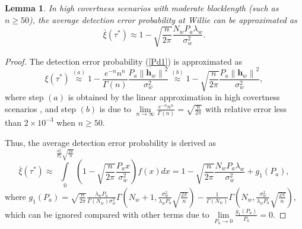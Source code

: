 \documentclass[conference]{IEEEtran}
\newtheorem{lemma}{Lemma}
\begin{document}
\begin{lemma}
	In high covertness scenarios with moderate blocklength (such as $n \ge 50$), the average detection error probability at Willie can be approximated as
	\begin{equation}\label{ave_Pd2}
		{\bar \xi}\left( {{\tau ^*}} \right) \approx 1 - \sqrt {\frac{n}{{2\pi }}} \frac{{{N_w}{P_a}{\lambda_w}}}{{ {\sigma_w ^2}}}.
	\end{equation}
\end{lemma}
\begin{proof}
	The detection error probability (\ref{Pd1}) is approximated as 
	\begin{equation}
		\xi \left( {{\tau ^*}} \right)\mathop  \approx \limits^{(a)} 1 - \frac{{{e^{ - n}}{n^n}}}{{\Gamma \left( n \right)}}\frac{{{P_a}{{\left\| {{{\mathbf{h}}_w}} \right\|}^2}}}{{\sigma _w^2}}\mathop  \approx \limits^{(b)} 1 - \sqrt {\frac{n}{{2\pi }}} \frac{{{P_a}{{\left\| {{{\mathbf{h}}_w}} \right\|}^2}}}{{\sigma _w^2}},
	\end{equation}
	where step $(a)$ is obtained by the linear approximation in high covertness scenarios \cite{linear}, and step $(b)$ is due to $\mathop {\lim }\limits_{n \to \infty } \frac{{{e^{ - n}}{n^n}}}{{\Gamma \left( n \right)}} = \sqrt {\frac{n}{{2\pi }}} $ with relative error less than $2\times10^{-3}$ when $n \ge 50$.
	
Thus, the average detection error probability is derived as
	\begin{equation}\label{appendix1}
		\bar \xi \left( {{\tau ^*}} \right) \!\!\approx\!\!\!\!\!\!\!\!\!\! \int\limits_0^{\frac{{\sigma _w^2}}{{{P_a}}}\sqrt {\frac{{2\pi }}{n}} } \!\!\!\!\!\!\!\!{\left(\!\! {1 \!\!-\!\! \sqrt {\frac{n}{{2\pi }}}\! \frac{{{P_a}x}}{{\sigma _w^2}}} \!\right)\!} {f}\!\left(\! x \!\right)\!dx\!=\!1 \!-\! \sqrt {\frac{n}{{2\pi }}} \frac{{{N_w}{P_a}{\lambda _w}}}{{\sigma _w^2}} \!+\! {g_1}\!\left(\! {{P_a}} \!\right)\!,
	\end{equation}
	where ${g_1}\left( {{P_a}} \right) = \sqrt {\frac{n}{{2\pi }}} \frac{{{\lambda _w}{P_a}}}{{\Gamma \left( {{N_w}} \right)\sigma _w^2}}\Gamma \left( {{N_w} \!+\! 1,\frac{{\sigma _w^2}}{{{\lambda _w}{P_a}}}\sqrt {\frac{{2\pi }}{n}} } \right) \!-\! \frac{1}{{\Gamma \left( {{N_w}} \right)}}\Gamma \left( {{N_w},\frac{{\sigma _w^2}}{{{\lambda _w}{P_a}}}\sqrt {\frac{{2\pi }}{n}} } \right)$, which can be ignored compared with other terms due to $\mathop {\lim }\limits_{{P_a} \to 0} \frac{{{g_1}\left( {{P_a}} \right)}}{{{P_a}}} \!=\! 0$.
\end{proof}
\end{document}
